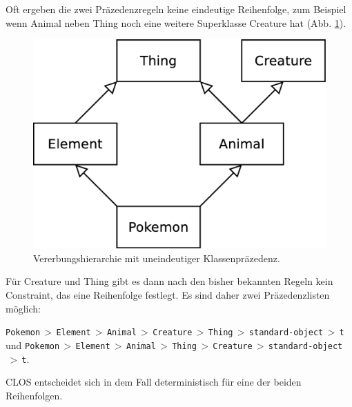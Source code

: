 Oft ergeben die zwei Präzedenzregeln keine eindeutige Reihenfolge, zum Beispiel wenn Animal neben Thing noch eine weitere Superklasse Creature hat (Abb. \ref{creature}). 
\begin{figure}[h]
 \centering
 \includegraphics[scale=0.3]{pictures/creature}
 \caption{Vererbungshierarchie mit uneindeutiger Klassenpräzedenz.}
 \label{creature}
\end{figure}
Für Creature und Thing gibt es dann nach den bisher bekannten Regeln kein Constraint, das eine Reihenfolge festlegt. Es sind daher zwei Präzedenzlisten möglich:

\texttt{Pokemon$\,>\,$Element$\,>\,$Animal$\,>\,$Creature$\,>\,$Thing$\,>\,$standard-object$\,>\,$t}
und
\texttt{Pokemon$\,>\,$Element$\,>\,$Animal$\,>\,$Thing$\,>\,$Creature$\,>\,$standard-object$\,>\,$t}.

CLOS entscheidet sich in dem Fall deterministisch für eine der beiden Reihenfolgen.

